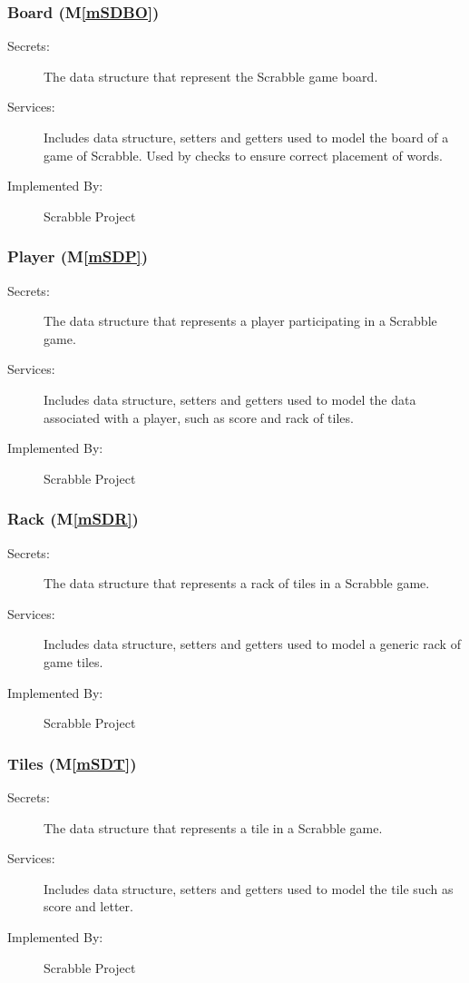 \documentclass[12pt, titlepage]{article}
\newcommand{\mref}[1]{M\ref{#1}}
\begin{document}
\subsubsection{Board (\mref{mSDBO})}
\begin{description}
\item[Secrets:] The data structure that represent the Scrabble game board.
\item[Services:] Includes data structure, setters and getters used to model the board of a game of Scrabble. Used by checks to ensure correct placement of words.
\item[Implemented By:] Scrabble Project
\end{description}

\subsubsection{Player (\mref{mSDP})}
\begin{description}
\item[Secrets:] The data structure that represents a player participating in a Scrabble game.
\item[Services:] Includes data structure, setters and getters used to model the data associated with a player, such as score and rack of tiles.
\item[Implemented By:] Scrabble Project
\end{description}

\subsubsection{Rack (\mref{mSDR})}
\begin{description}
\item[Secrets:] The data structure that represents a rack of tiles in a Scrabble game.
\item[Services:] Includes data structure, setters and getters used to model a generic rack of game tiles. 
\item[Implemented By:] Scrabble Project
\end{description}

\subsubsection{Tiles (\mref{mSDT})}
\begin{description}
\item[Secrets:] The data structure that represents a tile in a Scrabble game.
\item[Services:] Includes data structure, setters and getters used to model the tile such as score and letter.
\item[Implemented By:] Scrabble Project
\end{description}
\end{document}
